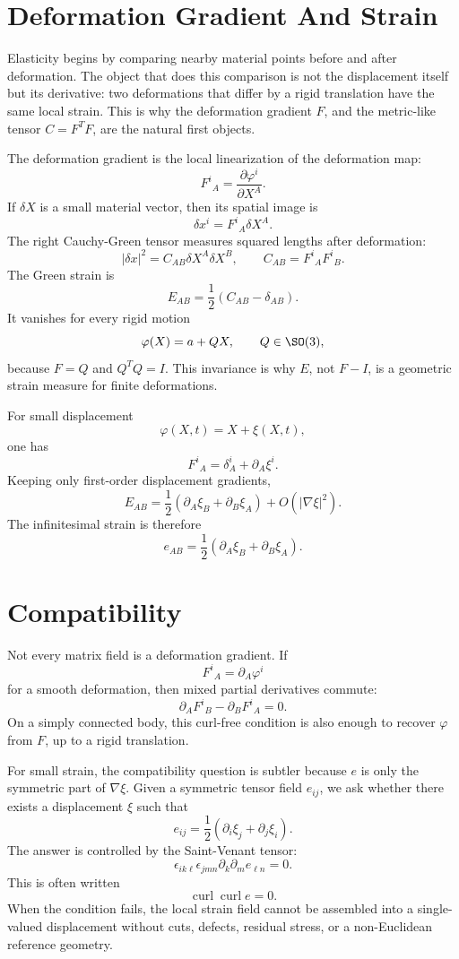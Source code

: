 \section{Deformation Gradient And Strain}
\label{sec:deformation-gradient-strain}

Elasticity begins by comparing nearby material points before and after
deformation. The object that does this comparison is not the displacement
itself but its derivative: two deformations that differ by a rigid translation
have the same local strain. This is why the deformation gradient \(F\), and the
metric-like tensor \(C=F^TF\), are the natural first objects.

The deformation gradient is the local linearization of the deformation map:
\[
  F^i{}_A=\frac{\partial \varphi^i}{\partial X^A}.
\]
If \(\delta X\) is a small material vector, then its spatial image is
\[
  \delta x^i=F^i{}_A\delta X^A.
\]
The right Cauchy-Green tensor measures squared lengths after deformation:
\[
  |\delta x|^2
  =
  C_{AB}\delta X^A\delta X^B,
  \qquad
  C_{AB}=F^i{}_AF^i{}_B.
\]
The Green strain is
\[
  E_{AB}=\frac12(C_{AB}-\delta_{AB}).
\]
It vanishes for every rigid motion
\[
  \varphi(X)=a+QX,\qquad Q\in\SO(3),
\]
because \(F=Q\) and \(Q^TQ=I\). This invariance is why \(E\), not \(F-I\), is a
geometric strain measure for finite deformations.

For small displacement
\[
  \varphi(X,t)=X+\xi(X,t),
\]
one has
\[
  F^i{}_A=\delta^i_A+\partial_A\xi^i.
\]
Keeping only first-order displacement gradients,
\[
  E_{AB}
  =
  \frac12(\partial_A\xi_B+\partial_B\xi_A)
  +
  O(|\nabla\xi|^2).
\]
The infinitesimal strain is therefore
\[
  \boxed{
  e_{AB}=\frac12(\partial_A\xi_B+\partial_B\xi_A).
  }
\]

\section{Compatibility}
\label{sec:elastic-compatibility}

Not every matrix field is a deformation gradient. If
\[
  F^i{}_A=\partial_A\varphi^i
\]
for a smooth deformation, then mixed partial derivatives commute:
\[
  \boxed{
  \partial_AF^i{}_B-\partial_BF^i{}_A=0.
  }
\]
On a simply connected body, this curl-free condition is also enough to recover
\(\varphi\) from \(F\), up to a rigid translation.

For small strain, the compatibility question is subtler because \(e\) is only
the symmetric part of \(\nabla\xi\). Given a symmetric tensor field \(e_{ij}\),
we ask whether there exists a displacement \(\xi\) such that
\[
  e_{ij}=\frac12(\partial_i\xi_j+\partial_j\xi_i).
\]
The answer is controlled by the Saint-Venant tensor:
\[
  \boxed{
  \epsilon_{ik\ell}\epsilon_{jmn}
  \partial_k\partial_m e_{\ell n}=0.
  }
\]
This is often written
\[
  \operatorname{curl}\operatorname{curl} e=0.
\]
When the condition fails, the local strain field cannot be assembled into a
single-valued displacement without cuts, defects, residual stress, or a
non-Euclidean reference geometry.

